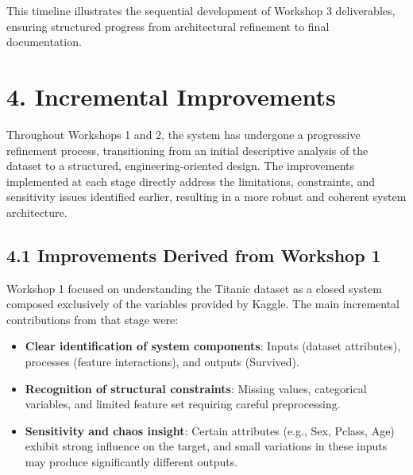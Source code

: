 \documentclass[12pt]{report}
\begin{document}
This timeline illustrates the sequential development of Workshop 3 deliverables, ensuring structured progress from architectural refinement to final documentation.



\hspace{1cm}   %
\hspace{1cm}   %
\hspace{1cm}   %
\hspace{1cm}   %
\hspace{1cm}   %
\hspace{1cm}   %
\hspace{1cm}   %
\hspace{1cm}   %

\section*{4. Incremental Improvements}

Throughout Workshops 1 and 2, the system has undergone a progressive refinement process, transitioning from an initial descriptive analysis of the dataset to a structured, engineering-oriented design. The improvements implemented at each stage directly address the limitations, constraints, and sensitivity issues identified earlier, resulting in a more robust and coherent system architecture.

\subsection*{4.1 Improvements Derived from Workshop 1}

Workshop 1 focused on understanding the Titanic dataset as a closed system composed exclusively of the variables provided by Kaggle. The main incremental contributions from that stage were:

\begin{itemize}
    \item \textbf{Clear identification of system components}: Inputs (dataset attributes), processes (feature interactions), and outputs (Survived).
    \item \textbf{Recognition of structural constraints}: Missing values, categorical variables, and limited feature set requiring careful preprocessing.
    \item \textbf{Sensitivity and chaos insight}: Certain attributes (e.g., Sex, Pclass, Age) exhibit strong influence on the target, and small variations in these inputs may produce significantly different outputs.
\end{itemize}
\end{document}
